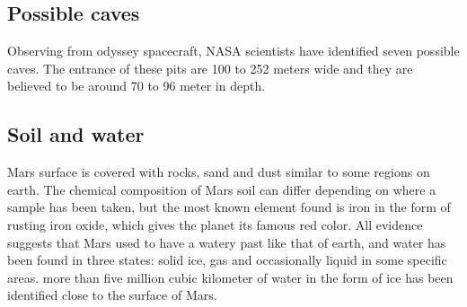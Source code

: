 \subsection{Possible caves}
Observing from odyssey spacecraft, NASA scientists have identified seven possible caves. The entrance of these pits are 100 to 252 meters wide and they are believed to be around 70 to 96 meter in depth\cite{surface}\cite{guide}.

\subsection{Soil and water }
Mars surface is covered with rocks, sand and dust similar to some regions on earth. %
The chemical composition of Mars soil can differ depending on where a sample has been taken, but the most known element found is iron in the form of rusting iron oxide, which gives the planet its famous red color.
\newline All evidence suggests that Mars used to have a watery past like that of earth, and water has been found in three states: solid ice, gas and occasionally liquid in some specific areas\cite{liquid}.
more than five million cubic kilometer of water in the form of ice  has been identified close to the surface of Mars\cite{water}.

